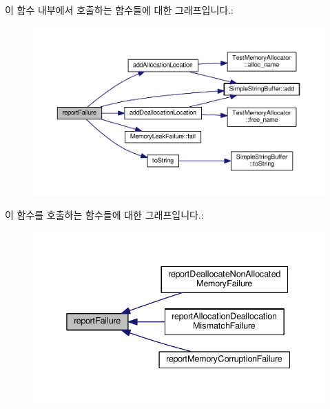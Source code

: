 이 함수 내부에서 호출하는 함수들에 대한 그래프입니다.\+:
\nopagebreak
\begin{figure}[H]
\begin{center}
\leavevmode
\includegraphics[width=350pt]{class_memory_leak_output_string_buffer_ae3d2ba0fc07468c3ac05c87be80caf55_cgraph}
\end{center}
\end{figure}




이 함수를 호출하는 함수들에 대한 그래프입니다.\+:
\nopagebreak
\begin{figure}[H]
\begin{center}
\leavevmode
\includegraphics[width=338pt]{class_memory_leak_output_string_buffer_ae3d2ba0fc07468c3ac05c87be80caf55_icgraph}
\end{center}
\end{figure}



